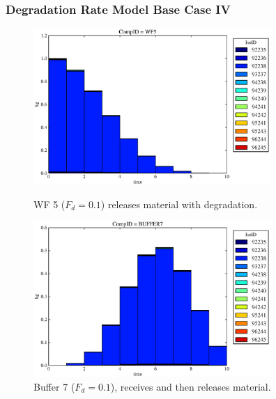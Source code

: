 \begin{frame}
  \frametitle{Degradation Rate Model Base Case IV}
  \begin{figure}
\begin{minipage}[b]{0.45\linewidth}

  \includegraphics[width=0.8\textwidth]{./images/drIV1.eps}
  \caption[DRIV WF Contaminants.]{
    WF 5 ($F_d = 0.1$) releases material with degradation. 
    }
  \label{fig:drIVwf5}
  
  \includegraphics[width=0.8\textwidth]{./images/drIV3.eps}
  \caption[Case DRIV Buffer Contaminants]{
    Buffer 7 ($F_d=0.1$), receives and then releases material.
    }
  \label{fig:drIVbuff}


\end{minipage}
\end{figure}
\end{frame}

